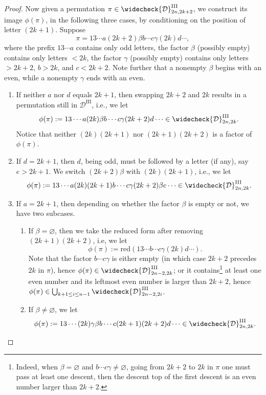 \documentclass[11pt,reqno]{amsart}
\numberwithin{equation}{section}
\theoremstyle{plain}
\theoremstyle{definition}
\newcommand{\D}{\mathcal{D}}
\newcommand{\DIII}{\D^{\mathrm{III}}}
\newcommand{\cD}{\widecheck{\D}^{\mathrm{III}}}
\def\re{\mathrm{red}}
\begin{document}
\begin{proof}
	Now given a permutation $\pi\in\cD_{2n,2k+2}$, we construct its image $\phi(\pi)$, in the following three cases, by conditioning on the position of letter $(2k+1)$. Suppose 
	$$\pi=13 \cdots a (2k+2)\beta b\cdots c\gamma (2k) d \cdots,$$
	where the prefix $13\cdots a$ contains only odd letters, the factor $\beta$ (possibly empty) contains only letters $<2k$, the factor $\gamma$ (possibly empty) contains only letters $>2k+2$, $b>2k$, and $c<2k+2$. Note further that a nonempty $\beta$ begins with an even, while a nonempty $\gamma$ ends with an even.
	\begin{enumerate}[label=(\arabic*)]
		\item If neither $a$ nor $d$ equals $2k+1$, then swapping $2k+2$ and $2k$ results in a permutation still in $\DIII$, i.e., we let
		$$\phi(\pi):= 13\cdots a (2k)\beta b\cdots c\gamma (2k+2) d \cdots \in \cD_{2n,2k}.$$
		Notice that neither $(2k)(2k+1)$ nor $(2k+1)(2k+2)$ is a factor of $\phi(\pi)$.
		
		\item If $d=2k+1$, then $d$, being odd, must be followed by a letter (if any), say $e>2k+1$. We switch $(2k+2)\beta$ with $(2k)(2k+1)$, i.e., we let 
		\begin{align*}
			\phi(\pi):= 13\cdots a (2k)(2k+1) b\cdots c\gamma (2k+2)\beta e\cdots\in\cD_{2n,2k}.
		\end{align*}

		\item If $a=2k+1$, then depending on whether the factor $\beta$ is empty or not, we have two subcases.
		\begin{enumerate}
			\item If $\beta=\varnothing$, then we take the reduced form after removing $(2k+1)(2k+2)$, i.e, we let
			$$\phi(\pi):=\re(13\cdots b\cdots c\gamma(2k)d\cdots).$$
			Note that the factor $b\cdots c\gamma$ is either empty (in which case $2k+2$ precedes $2k$ in $\pi$), hence $\phi(\pi)\in\cD_{2n-2,2k}$; or it contains\footnote{Indeed, when $\beta=\varnothing$ and $b\cdots c\gamma\neq\varnothing$, going from $2k+2$ to $2k$ in $\pi$ one must pass at least one descent, then the descent top of the first descent is an even number larger than $2k+2$.} at least one even number and its leftmost even number is larger than $2k+2$, hence $\phi(\pi)\in\bigcup_{k+1\le i\le n-1}\cD_{2n-2,2i}$.

			\item If $\beta\neq\varnothing$, we let
			$$\phi(\pi):= 13\cdots (2k)\gamma\beta b\cdots c(2k+1)(2k+2)d\cdots\in\cD_{2n,2k}.$$


\end{enumerate}
\end{enumerate}
\end{proof}
\end{document}
